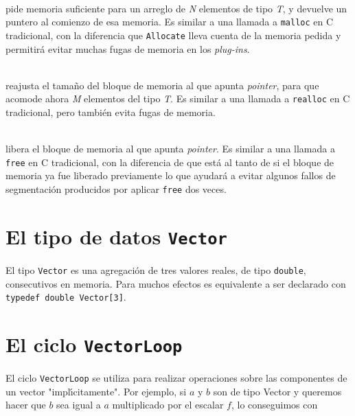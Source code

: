 \documentclass[a4paper,12pt]{article}
\begin{document}
\begin{center}
 \\
\vspace{15pt}
%
pide memoria suficiente para un arreglo de \emph{N} elementos de tipo \emph{T}, y devuelve un
puntero al comienzo de esa memoria. Es similar a una llamada a \verb'malloc' en
C tradicional, con la diferencia que \verb'Allocate' lleva cuenta de la memoria
pedida y permitir\'a evitar muchas fugas de memoria en los \emph{plug-ins}.
\vspace{15pt}

 \\
\vspace{15pt}
%
reajusta el tama\~no del bloque de memoria al que apunta \emph{pointer}, para
que acomode ahora \emph{M} elementos del tipo \emph{T}. Es similar a una llamada
a \verb'realloc' en C tradicional, pero tambi\'en evita fugas de memoria.

\vspace{15pt}
 \\
\vspace{15pt}
%
libera el bloque de memoria al que apunta \emph{pointer}. Es similar a una
llamada a \verb'free' en C tradicional, con la diferencia de que est\'a al tanto
de si el bloque de memoria ya fue liberado previamente lo que ayudar\'a a evitar
algunos fallos de segmentaci\'on producidos por aplicar \verb'free' dos veces.
\end{center}

\section{El tipo de datos \texttt{Vector}}

El tipo \verb'Vector' es una agregaci\'on de tres valores reales, de tipo
\verb'double', consecutivos en memoria. Para muchos efectos es equivalente a ser
declarado con \verb'typedef double Vector[3]'.

\section{El ciclo \texttt{VectorLoop}}

El ciclo \verb'VectorLoop' se utiliza para realizar operaciones sobre las
componentes de un vector "impl\'{\i}citamente". Por ejemplo, si $a$ y $b$ son de 
tipo Vector y queremos hacer que $b$ sea igual a $a$ multiplicado por el escalar $f$, 
lo conseguimos con
\end{document}
